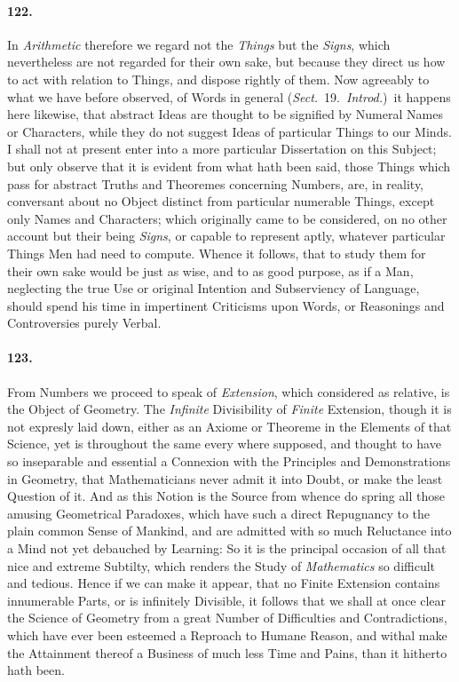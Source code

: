 \documentclass[]{article}
\newenvironment{sectionbody}{}{}
\begin{document}
\begin{sectionbody}
\paragraph{122.} In \emph{Arithmetic} therefore we regard not the
\emph{Things} but the \emph{Signs}, which nevertheless are
not regarded for their own sake, but because they direct us how
to act with relation to Things, and dispose rightly of them.  Now
agreeably to what we have before observed, of Words in general
(\emph{Sect.}\ 19.\ \emph{Introd.})\ it happens
here likewise, that abstract Ideas are thought to be
signified by Numeral Names or Characters, while they do not
suggest Ideas of particular Things to our Minds.  I shall not at
present enter into a more particular Dissertation on this
Subject; but only observe that it is evident from what hath been
said, those Things which pass for abstract Truths and Theoremes
concerning Numbers, are, in reality, conversant about no Object
distinct from particular numerable Things, except only Names and
Characters; which originally came to be considered, on no other
account but their being \emph{Signs}, or capable to represent
aptly, whatever particular Things Men had need to compute.
Whence it follows, that to study them for their own sake would be
just as wise, and to as good purpose, as if a Man, neglecting the
true Use or original Intention and Subserviency of Language,
should spend his time in impertinent Criticisms upon Words, or
Reasonings and Controversies purely Verbal.



\paragraph{123.} From Numbers we proceed to speak of \emph{Extension}, which
considered as relative, is the Object of Geometry.  The
\emph{Infinite} Divisibility of \emph{Finite} Extension,
though it is not expresly laid down, either as an Axiome or
Theoreme in the Elements of that Science, yet is throughout the
same every where supposed, and thought to have so inseparable and
essential a Connexion with the Principles and Demonstrations in
Geometry, that Mathematicians never admit it into Doubt, or make
the least Question of it.  And as this Notion is the Source from
whence do spring all those amusing Geometrical Paradoxes, which
have such a direct Repugnancy to the plain common Sense of
Mankind, and are admitted with so much Reluctance into a Mind not
yet debauched by Learning: So it is the principal occasion of all
that nice and extreme Subtilty, which renders the Study of
\emph{Mathematics} so difficult and tedious.  Hence if we can
make it appear, that no Finite Extension contains innumerable
Parts, or is infinitely Divisible, it follows that we shall at
once clear the Science of Geometry from a great Number of
Difficulties and Contradictions, which have ever been esteemed a
Reproach to Humane Reason, and withal make the Attainment thereof
a Business of much less Time and Pains, than it hitherto hath
been.




\end{sectionbody}
\end{document}
